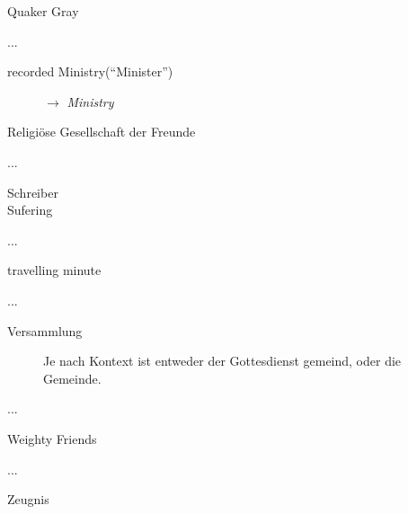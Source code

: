 \begin{description}
\begin{description}
 \item[Quaker Gray]
 \end{description}
 \item[R]...
\begin{description}
 \item[recorded Ministry("`Minister"')] $\to$ \textit{Ministry}
 \item[Religiöse Gesellschaft der Freunde]
 \end{description}
 \item[S]...
\begin{description}
 \item[Schreiber]
 \item[Sufering]
 \end{description}
 \item[T]...
\begin{description}
 \item[travelling minute]
 \end{description}
 \item[V]...
\begin{description}
 \item[Versammlung] Je nach Kontext ist entweder der Gottesdienst gemeind, oder die Gemeinde.
 \end{description}
 \item[W]...
\begin{description}
 \item[Weighty Friends]
 \end{description}
 \item[Z]...
\begin{description}
 \item[Zeugnis]
 \end{description}
 \end{description}
